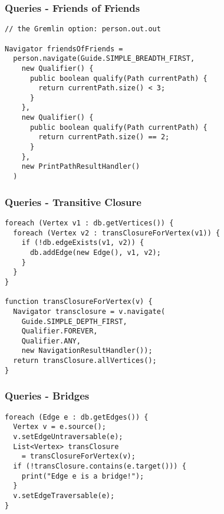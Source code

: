 
\begin{frame}[fragile]
\frametitle{Queries - Friends of Friends}

\begin{lstlisting}
// the Gremlin option: person.out.out

Navigator friendsOfFriends = 
  person.navigate(Guide.SIMPLE_BREADTH_FIRST,
    new Qualifier() {
      public boolean qualify(Path currentPath) {
        return currentPath.size() < 3;
      }
    },
    new Qualifier() {
      public boolean qualify(Path currentPath) {
        return currentPath.size() == 2;
      }
    },
    new PrintPathResultHandler()
  )
\end{lstlisting}
\end{frame}



\begin{frame}[fragile]
\frametitle{Queries - Transitive Closure}

\begin{lstlisting}
foreach (Vertex v1 : db.getVertices()) {
  foreach (Vertex v2 : transClosureForVertex(v1)) {  
    if (!db.edgeExists(v1, v2)) {
      db.addEdge(new Edge(), v1, v2);
    }
  }
}

function transClosureForVertex(v) {
  Navigator transclosure = v.navigate(
    Guide.SIMPLE_DEPTH_FIRST, 
    Qualifier.FOREVER,
    Qualifier.ANY,
    new NavigationResultHandler());
  return transClosure.allVertices();
}
\end{lstlisting}
\end{frame}



\begin{frame}[fragile]
\frametitle{Queries - Bridges}

\begin{lstlisting}
foreach (Edge e : db.getEdges()) {
  Vertex v = e.source();
  v.setEdgeUntraversable(e);
  List<Vertex> transClosure
    = transClosureForVertex(v);
  if (!transClosure.contains(e.target())) {
    print("Edge e is a bridge!");
  }
  v.setEdgeTraversable(e);
}
\end{lstlisting}
\end{frame}
